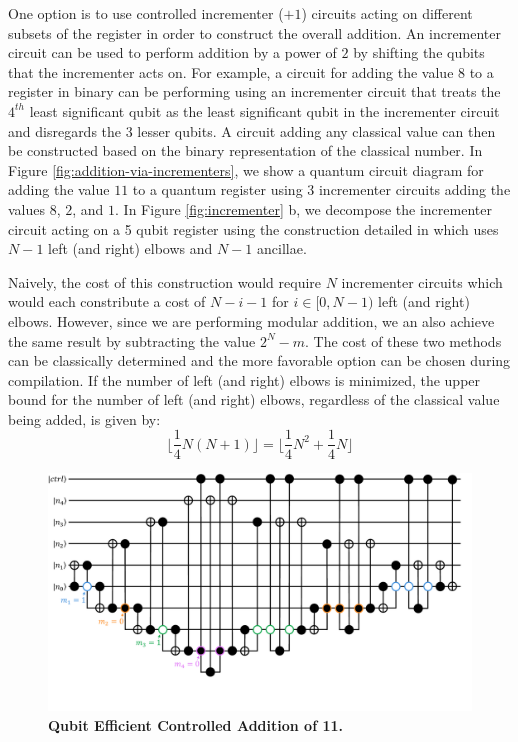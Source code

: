 One option is to use controlled incrementer ($+1$) circuits acting on different subsets of the register in order to construct the overall addition.
An incrementer circuit can be used to perform addition by a power of $2$ by shifting the qubits that the incrementer acts on.
For example, a circuit for adding the value $8$ to a register in binary can be performing using an incrementer circuit that treats the $4^{th}$ least significant qubit as the least significant qubit in the incrementer circuit and disregards the $3$ lesser qubits.
A circuit adding any classical value can then be constructed based on the binary representation of the classical number.
In Figure \ref{fig:addition-via-incrementers}, we show a quantum circuit diagram for adding the value $11$ to a quantum register using $3$ incrementer circuits adding the values $8$, $2$, and $1$. 
In Figure \ref{fig:incrementer} b, we decompose the incrementer circuit acting on a 5 qubit register using the construction detailed in \cite{Gidney_2015} which uses $N - 1$ left (and right) elbows and $N - 1$ ancillae.

Naively, the cost of this construction would require $N$ incrementer circuits which would each constribute a cost of $N - i - 1$ for $i \in [0, N-1)$ left (and right) elbows.
However, since we are performing modular addition, we an also achieve the same result by subtracting the value $2^N - m$.
The cost of these two methods can be classically determined and the more favorable option can be chosen during compilation.
If the number of left (and right) elbows is minimized, the upper bound for the number of left (and right) elbows, regardless of the classical value being added, is given by:
\begin{equation}
    \lfloor \frac{1}{4} N (N + 1) \rfloor = \lfloor \frac{1}{4} N^2 + \frac{1}{4} N \rfloor
\end{equation} 

\begin{figure}
    \centering
    \includegraphics[width=12cm]{figures/ctrl-add-11-qubit-efficient.pdf}
    \caption{
        \textbf{Qubit Efficient Controlled Addition of 11.} 
    }
    \label{fig:addition-qubit-efficient-11}
\end{figure}

